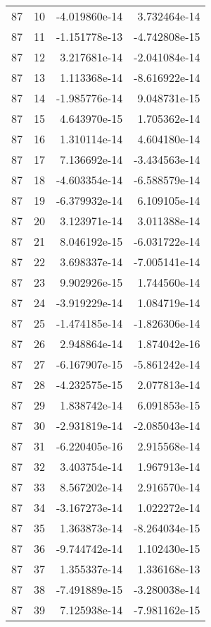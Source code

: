\begin{tabular}{rrrr}
  87 &   10 & -4.019860e-14 &  3.732464e-14 \\
  87 &   11 & -1.151778e-13 & -4.742808e-15 \\
  87 &   12 &  3.217681e-14 & -2.041084e-14 \\
  87 &   13 &  1.113368e-14 & -8.616922e-14 \\
  87 &   14 & -1.985776e-14 &  9.048731e-15 \\
  87 &   15 &  4.643970e-15 &  1.705362e-14 \\
  87 &   16 &  1.310114e-14 &  4.604180e-14 \\
  87 &   17 &  7.136692e-14 & -3.434563e-14 \\
  87 &   18 & -4.603354e-14 & -6.588579e-14 \\
  87 &   19 & -6.379932e-14 &  6.109105e-14 \\
  87 &   20 &  3.123971e-14 &  3.011388e-14 \\
  87 &   21 &  8.046192e-15 & -6.031722e-14 \\
  87 &   22 &  3.698337e-14 & -7.005141e-14 \\
  87 &   23 &  9.902926e-15 &  1.744560e-14 \\
  87 &   24 & -3.919229e-14 &  1.084719e-14 \\
  87 &   25 & -1.474185e-14 & -1.826306e-14 \\
  87 &   26 &  2.948864e-14 &  1.874042e-16 \\
  87 &   27 & -6.167907e-15 & -5.861242e-14 \\
  87 &   28 & -4.232575e-15 &  2.077813e-14 \\
  87 &   29 &  1.838742e-14 &  6.091853e-15 \\
  87 &   30 & -2.931819e-14 & -2.085043e-14 \\
  87 &   31 & -6.220405e-16 &  2.915568e-14 \\
  87 &   32 &  3.403754e-14 &  1.967913e-14 \\
  87 &   33 &  8.567202e-14 &  2.916570e-14 \\
  87 &   34 & -3.167273e-14 &  1.022272e-14 \\
  87 &   35 &  1.363873e-14 & -8.264034e-15 \\
  87 &   36 & -9.744742e-14 &  1.102430e-15 \\
  87 &   37 &  1.355337e-14 &  1.336168e-13 \\
  87 &   38 & -7.491889e-15 & -3.280038e-14 \\
  87 &   39 &  7.125938e-14 & -7.981162e-15 \\

\end{tabular}
